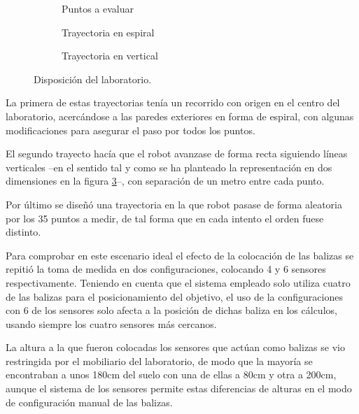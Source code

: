 \begin{figure}[H]
    \begin{subfigure}[b]{.3\textwidth}
      \centering
      \def\svgwidth{0.8\linewidth}
	     
      \caption{Puntos a evaluar}
      \label{fig:puntos}
    \end{subfigure}
    \begin{subfigure}[b]{.3\textwidth}
      \centering
      \def\svgwidth{0.8\linewidth}
	     
      \caption{Trayectoria en espiral}
      \label{fig:espiral}
    \end{subfigure}
    \begin{subfigure}[b]{.3\textwidth}
        \centering
        \def\svgwidth{0.8\linewidth}
	     
        \caption{Trayectoria en vertical}
        \label{fig:vertical}
      \end{subfigure}
    \caption{Disposición del laboratorio.}
    \label{fig:laboratorio}
\end{figure}

La primera de estas trayectorias tenía un recorrido con origen en el centro del laboratorio, acercándose a las paredes exteriores en forma de espiral, con algunas modificaciones para asegurar el paso por todos los puntos.

El segundo trayecto hacía que el robot avanzase de forma recta siguiendo líneas verticales --en el sentido tal y como se ha planteado la representación en dos dimensiones en la figura \ref{fig:vertical}--, con separación de un metro entre cada punto.

Por último se diseñó una trayectoria en la que robot pasase de forma aleatoria por los 35 puntos a medir, de tal forma que en cada intento el orden fuese distinto.

Para comprobar en este escenario ideal el efecto de la colocación de las balizas se repitió la toma de medida en dos configuraciones, colocando 4 y 6 sensores respectivamente.
Teniendo en cuenta que el sistema empleado solo utiliza cuatro de las balizas para el posicionamiento del objetivo, el uso de la configuraciones con 6 de los sensores solo afecta a la posición de dichas baliza en los cálculos, usando siempre los cuatro sensores más cercanos.

La altura a la que fueron colocadas los sensores que actúan como balizas se vio restringida por el mobiliario del laboratorio, de modo que la mayoría se encontraban a unos 180cm del suelo con una de ellas a 80cm y otra a 200cm, aunque el sistema de los sensores permite estas diferencias de alturas en el modo de configuración manual de las balizas.


